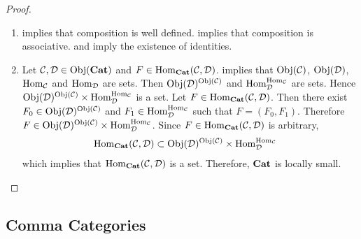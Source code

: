 \documentclass{book}
\begin{document}
	\begin{proof}\
		\begin{enumerate}
			\item {} implies that composition is well defined.  implies that composition is associative.  and  imply the existence of identities.
			\item Let $\MC, \MD \in \Obj(\tbf{Cat})$ and $F \in \Hom_{\tbf{Cat}}(\MC, \MD)$. \rd{12002} implies that $\Obj(\MC)$, $\Obj(\MD)$, $\Hom_{\MC}$ and $\Hom_{\MD}$ are sets. Then $\Obj(\MD)^{\Obj(\MC)}$ and $\Hom_{\MD}^{ \Hom_{\MC}}$ are sets. Hence $ \Obj(\MD)^{\Obj(\MC)} \times  \Hom_{\MD}^{ \Hom_{\MC}}$ is a set. Let $F \in \Hom_{\tbf{Cat}}(\MC, \MD)$. Then there exist $F_0 \in \Obj(\MD)^{\Obj(\MC)} $ and $F_1 \in \Hom_{\MD}^{ \Hom_{\MC}}$ such that $F = (F_0, F_1)$. Therefore $F \in  \Obj(\MD)^{\Obj(\MC)} \times  \Hom_{\MD}^{ \Hom_{\MC}}$. Since $F \in \Hom_{\tbf{Cat}}(\MC, \MD)$ is arbitrary, 
			\begin{align*}
				\Hom_{\tbf{Cat}}(\MC, \MD) 
				& \subset \Obj(\MD)^{\Obj(\MC)} \times  \Hom_{\MD}^{ \Hom_{\MC}}
			\end{align*}
			which implies that $\Hom_{\tbf{Cat}}(\MC, \MD)$ is a set. Therefore, $\tbf{Cat}$ is locally small.
		\end{enumerate} 
	\end{proof}















	\subsection{Comma Categories}
\end{document}
